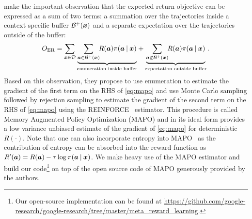 \citet{NIPS2018_8204} make the important observation that the
expected return objective can be expressed as a sum of two terms: a
summation over the trajectories inside a context specific buffer
$\mathcal{B}^+({\bm{x}})$ and a separate expectation over the trajectories outside
of the buffer:
\begin{equation}
\displaystyle O_{\mathrm{ER}} = \sum_{{\bm{x}} \in {\mathcal{D}}}
\underbrace{\sum_{{\bm{a}} \in \mathcal{B}^+({\bm{x}})}\!\! R({\bm{a}}) \pi({\bm{a}} \:\vert\: {\bm{x}})}_{\text{enumeration inside buffer}} + 
\underbrace{\sum_{{\bm{a}} \not\in \mathcal{B}^+({\bm{x}})}\!\! R({\bm{a}}) \pi({\bm{a}} \:\vert\: {\bm{x}})}_{\text{expectation outside buffer}}.
\label{eq:mapo}
\end{equation}
Based on this observation, they propose to use enumeration to estimate
the gradient of the first term on the RHS of \eqref{eq:mapo} and use
Monte Carlo sampling followed by rejection sampling to estimate the gradient of
the second term on the RHS of \eqref{eq:mapo} using the
REINFORCE~\cite{Williams92simplestatistical} estimator. This procedure
is called Memory Augmented Policy Optimization (MAPO) and in its ideal
form provides a low variance unbiased estimate of the gradient of
\eqref{eq:mapo} for deterministic $R(\cdot)$. Note that one can also
incorporate entropy into MAPO~\cite{NIPS2018_8204} as the
contribution of entropy can be absorbed into the reward function as
$R'({\bm{a}}) = R({\bm{a}}) - \tau\log\pi({\bm{a}}\:\vert\:{\bm{x}})$. We make heavy use of the
MAPO estimator and build our code\footnote{Our open-source implementation can be found at
\url{https://github.com/google-research/google-research/tree/master/meta_reward_learning}.} on top of the open source code of
MAPO generously provided by the authors.
